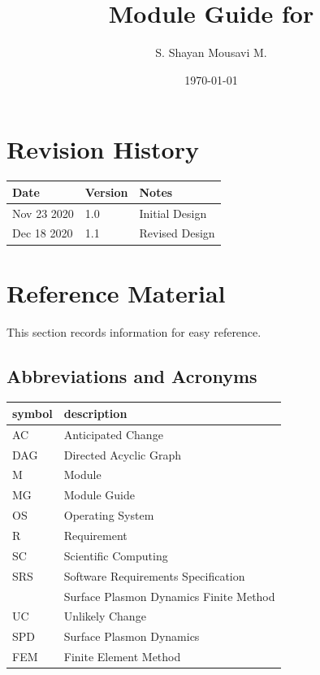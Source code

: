 \documentclass[12pt, titlepage]{article}
\begin{document}
	
	\title{Module Guide for \progname{}} \author{S. Shayan Mousavi M.}
	\date{\today}
	
	\maketitle
	
	
	\section{Revision History}
	
	\begin{tabularx}{\textwidth}{p{3cm}p{2cm}X} \toprule {\bf Date} & {\bf Version}
		& {\bf Notes}\\ \midrule Nov 23 2020 & 1.0 & Initial Design\\ Dec 18 2020 & 1.1
		& Revised Design\\ \bottomrule \end{tabularx}
	
	\newpage
	
	\section{Reference Material}
	
	This section records information for easy reference.
	
	\subsection{Abbreviations and Acronyms}
	
	\renewcommand{\arraystretch}{1.2} \begin{tabular}{l l} \toprule \textbf{symbol}
		& \textbf{description}\\ \midrule AC & Anticipated Change\\ DAG & Directed
		Acyclic Graph \\ M & Module \\ MG & Module Guide \\ OS & Operating System \\ R
		& Requirement\\ SC & Scientific Computing \\ SRS & Software Requirements
		Specification\\ \progname{} & Surface Plasmon Dynamics Finite Method\\ UC &
		Unlikely Change \\ SPD & Surface Plasmon Dynamics\\ FEM & Finite Element
		Method\\ \bottomrule \end{tabular}\\
	
\end{document}
